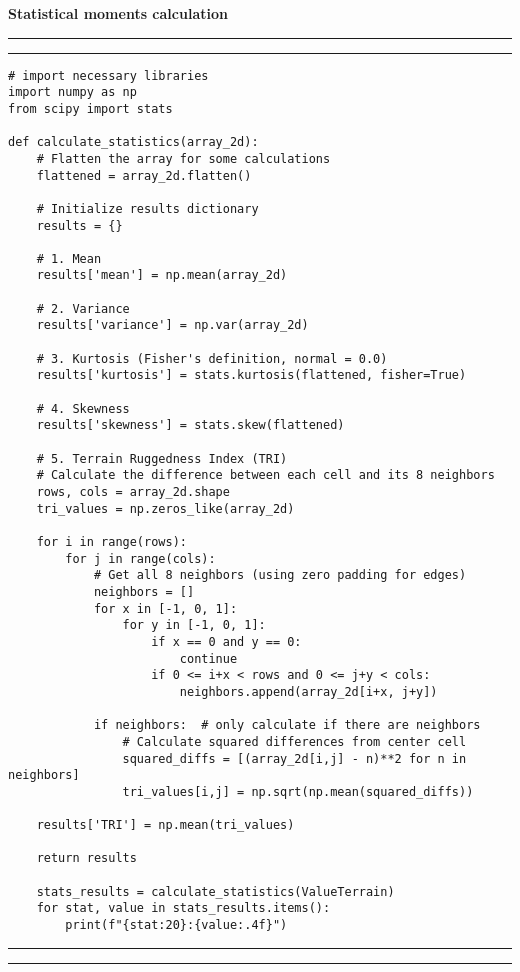 \pagebreak
\textbf{\large{Statistical moments calculation}}
\vspace{2.5pt}
\hrule
\vspace{1mm}
\hrule
\begin{lstlisting}
# import necessary libraries
import numpy as np
from scipy import stats

def calculate_statistics(array_2d):
    # Flatten the array for some calculations
    flattened = array_2d.flatten()
    
    # Initialize results dictionary
    results = {}
    
    # 1. Mean
    results['mean'] = np.mean(array_2d)
    
    # 2. Variance
    results['variance'] = np.var(array_2d)
    
    # 3. Kurtosis (Fisher's definition, normal = 0.0)
    results['kurtosis'] = stats.kurtosis(flattened, fisher=True)
    
    # 4. Skewness
    results['skewness'] = stats.skew(flattened)
    
    # 5. Terrain Ruggedness Index (TRI)
    # Calculate the difference between each cell and its 8 neighbors
    rows, cols = array_2d.shape
    tri_values = np.zeros_like(array_2d)
    
    for i in range(rows):
        for j in range(cols):
            # Get all 8 neighbors (using zero padding for edges)
            neighbors = []
            for x in [-1, 0, 1]:
                for y in [-1, 0, 1]:
                    if x == 0 and y == 0:
                        continue 
                    if 0 <= i+x < rows and 0 <= j+y < cols:
                        neighbors.append(array_2d[i+x, j+y])
        
            if neighbors:  # only calculate if there are neighbors
                # Calculate squared differences from center cell
                squared_diffs = [(array_2d[i,j] - n)**2 for n in neighbors]
                tri_values[i,j] = np.sqrt(np.mean(squared_diffs))
    
    results['TRI'] = np.mean(tri_values)
    
    return results
    
    stats_results = calculate_statistics(ValueTerrain)
    for stat, value in stats_results.items():
        print(f"{stat:20}:{value:.4f}")
\end{lstlisting}
\hrule
\vspace{1mm}
\hrule
\vspace{5mm}


